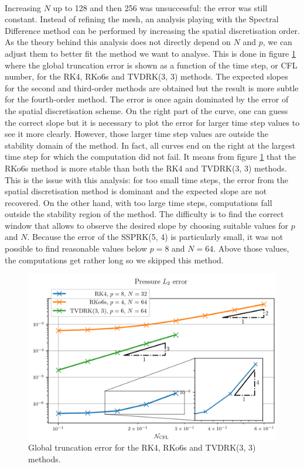       \paragraph{}
      Increasing $N$ up to 128 and then 256 was unsuccessful: the error was still constant.
      Instead of refining the mesh, an analysis playing with the Spectral Difference method can be performed by increasing the spatial discretisation order.
      As the theory behind this analysis does not directly depend on $N$ and $p$, we can adjust them to better fit the method we want to analyse.
      This is done in figure \ref{fig:covo_rk} where the global truncation error is shown as a function of the time step, or CFL number, for the RK4, RKo6s and TVDRK(3, 3) methods.
      The expected slopes for the second and third-order methods are obtained but the result is more subtle for the fourth-order method.
      The error is once again dominated by the error of the spatial discretisation scheme.
      On the right part of the curve, one can guess the correct slope but it is necessary to plot the error for larger time step values
      to see it more clearly.
      However, those larger time step values are outside the stability domain of the method.
      In fact, all curves end on the right at the largest time step for which the computation did not fail.
      It means from figure \ref{fig:covo_rk} that the RKo6s method is more stable than both the RK4 and TVDRK(3, 3) methods.
      This is the issue with this analysis: for too small time steps, the error from the spatial discretisation method is dominant and the expected slope are not recovered.
      On the other hand, with too large time steps, computations fall outside the stability region of the method.
      The difficulty is to find the correct window that allows to observe the desired slope by choosing suitable values for $p$ and $N$.
      Because the error of the SSPRK(5, 4) is particularly small, it was not possible to find reasonable values below $p = 8$ and $N = 64$.
      Above those values, the computations get rather long so we skipped this method.

      \begin{figure}
        \centering
        \includegraphics{figures/covo_rk.png}
        \caption{Global truncation error for the RK4, RKo6s and TVDRK(3, 3) methods.}
        \label{fig:covo_rk}
      \end{figure}


